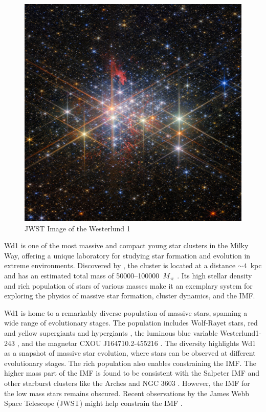 \documentclass[12pt]{ucsddissertation}
\begin{document}
\begin{CJK*}{UTF8}{gbsn}
\begin{figure}[htb!]
    \centering
    \includegraphics[width=0.6\linewidth]{figures/intro/Westerlund1.jpg}
    \caption[Westerlund 1]{JWST Image of the Westerlund 1}
    \label{fig:wd1-jwst}
\end{figure}
Wd1 is one of the most massive and compact young star clusters in the Milky Way, offering a unique laboratory for studying star formation and evolution in extreme environments. Discovered by \citet{Westerlund-1961}, the cluster is located at a distance $\sim4$~kpc \citep[][]{Negueruela-2022, Rocha-2022} and has an estimated total mass of \num{50000}--\num{100000}~$M_\sun$ \citep[][]{Clark-2005, PortegiesZwart-2010}. Its high stellar density and rich population of stars of various masses make it an exemplary system for exploring the physics of massive star formation, cluster dynamics, and the IMF.

Wd1 is home to a remarkably diverse population of massive stars, spanning a wide range of evolutionary stages. The population includes Wolf-Rayet stars, red and yellow supergiants and hypergiants \citep[][]{Clark-2005, Crowther-2006}, the luminous blue variable Westerlund1-243 \citep[][]{Clark-2004, Ritchie-2009}, and the magnetar CXOU J164710.2-455216 \citep[][]{Muno-2006}. The diversity highlights Wd1 as a snapshot of massive star evolution, where stars can be observed at different evolutionary stages. The rich population also enables constraining the IMF. The higher mass part of the IMF is found to be consistent with the Salpeter IMF and other starburst clusters like the Arches and NGC 3603 \citep[][]{Brandner-2008, Lim-2013}. However, the IMF for the low mass stars remains obscured. Recent observations by the James Webb Space Telescope (JWST) might help constrain the IMF \citep[][]{Guarcello-2025}.


\end{CJK*}
\end{document}
